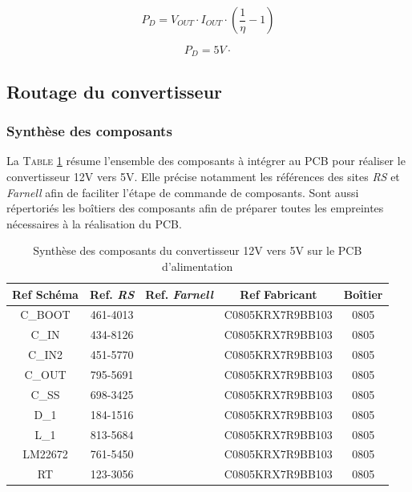 \documentclass[a4paper,12pt]{report}
\begin{document}
			\begin{equation}
				P_D = V_{OUT}\cdot I_{OUT}\cdot\left(\frac{1}{\eta}-1\right)
			\end{equation}	
			
			\begin{equation}
				P_D  = 5V\cdot
			\end{equation}							
			
			
			
			\subsection{Routage du convertisseur}
			
				\subsubsection{Synthèse des composants}
				
				La \textsc{Table \ref{synth_composants}} résume l'ensemble des composants à intégrer au PCB pour réaliser le convertisseur 12V vers 5V. Elle précise notamment les références des sites \textit{RS} et \textit{Farnell} afin de faciliter l'étape de commande de composants. Sont aussi répertoriés les boîtiers des composants afin de préparer toutes les empreintes nécessaires à la réalisation du PCB.
				
				\begin{table}
					\begin{center}
						\begin{tabular}{|c|c|c|c|c|}
						\hline
						\textbf{Ref Schéma} & Ref. \textit{RS} & Ref. \textit{Farnell} & Ref Fabricant & Boîtier \\ 
						\hline
						C\_BOOT & 461-4013 & & C0805KRX7R9BB103 & 0805 \\
						\hline
						C\_IN & 434-8126 & & C0805KRX7R9BB103 & 0805 \\
						\hline
						C\_IN2 & 451-5770 & & C0805KRX7R9BB103 & 0805 \\
						\hline
						C\_OUT & 795-5691 & & C0805KRX7R9BB103 & 0805 \\
						\hline
						C\_SS & 698-3425 & & C0805KRX7R9BB103 & 0805 \\
						\hline
						D\_1 & 184-1516 & & C0805KRX7R9BB103 & 0805 \\
						\hline
						L\_1 & 813-5684 & & C0805KRX7R9BB103 & 0805 \\
						\hline
						LM22672 & 761-5450 & & C0805KRX7R9BB103 & 0805 \\
						\hline
						RT & 123-3056 & & C0805KRX7R9BB103 & 0805 \\
						\hline
						\end{tabular}
					\end{center}
					\caption{Synthèse des composants du convertisseur 12V vers 5V sur le PCB d'alimentation}
					\label{synth_composants}
				\end{table}
				
\end{document}
